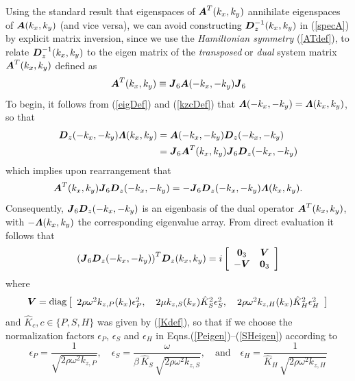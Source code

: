 \documentclass[11pt,a4paper]{article}
\newcommand{\bmi}[1]{\mbox{\boldmath$\mit #1$\unboldmath}}
\begin{document}
Using the standard result that eigenspaces of ${\bmi  A}^{T}({k}_{x},{k}_{y})$ annihilate
eigenspaces of ${\bmi  A}({k}_{x},{k}_{y})$ (and vice versa), we can avoid constructing  ${\bmi  D}_{z}^{-1}({k}_{x},{k}_{y})$ in (\ref{specA}) by explicit
matrix inversion, since we use the {\em Hamiltonian symmetry\/}
(\ref{ATdef}), to relate ${\bmi  D}_{z}^{-1}({k}_{x},{k}_{y})$ to the eigen matrix of the
{\em transposed\/} or {\em
dual\/} system matrix ${\bmi  A}^{T}({k}_{x},{k}_{y})$ defined as
\[
{\bmi  A}^{T}({k}_{x},{k}_{y})\equiv {\bmi  J}_6 {\bmi  A}(-{k}_{x},-{k}_{y}) {\bmi  J}_6
\]
To begin, it follows from (\ref{eigDef}) and (\ref{kzcDef}) that ${\bmi
\Lambda}(-{k}_{x},-{k}_{y})={\bmi \Lambda} ({k}_{x},{k}_{y})$,
so that
\begin{eqnarray*}
{\bmi  D}_{z}(-{k}_{x},-{k}_{y}){\bmi \Lambda} ({k}_{x},{k}_{y})&=
{\bmi  A}(-{k}_{x},-{k}_{y}){\bmi  D}_{z}(-{k}_{x},-{k}_{y})\\
&={\bmi  J}_{6}{\bmi
A}^{T}({k}_{x},{k}_{y}){\bmi  J}_{6}{\bmi  D}_{z}(-{k}_{x},-{k}_{y})
\end{eqnarray*}
which implies upon rearrangement that
\[
{\bmi  A}^{T}({k}_{x},{k}_{y}){\bmi  J}_{6}{\bmi  D}_{z}(-{k}_{x},-{k}_{y})=-{\bmi  J}_{6}
{\bmi  D}_{z}(-{k}_{x},-{k}_{y}){\bmi
\Lambda} ({k}_{x},{k}_{y}).
\]
Consequently, ${\bmi  J}_{6}{\bmi  D}_{z}(-{k}_{x},-{k}_{y})$ is an eigenbasis of the dual
operator ${\bmi
A}^{T}({k}_{x},{k}_{y})$, with $-{\bmi  \Lambda} ({k}_{x},{k}_{y})$ the corresponding eigenvalue array.
From direct evaluation it follows that
\begin{equation} \label{dinv1}
{\left({{\bmi  J}_{6}{\bmi  D}_{z}(-{k}_{x},-{k}_{y})}\right)}^{T}{\bmi
D}_{z}({k}_{x},{k}_{y})= i\left[{\begin{array}{cc}{\bf 0}_{3}&{\bmi V}\\
-{\bmi V}&{\bf 0}_{3}\end{array}}\right]
\end{equation}
where
\[
{\bmi V}=
\mbox{diag}\left[\begin{array}{ccc}
2 \rho {\omega }^{  2}{  k}_{  z, P }({k}_{x}){\epsilon
}_{P}^{  2},\,&
2 \mu {  k}_{  z, S }({k}_{x}) \hat{K}_{S }^{2}{\epsilon }_{S}^{
2},\,&
2 \rho {\omega }^{  2}{  k}_{  z, H }({k}_{x}) \hat{K}_{H }^{2}{\epsilon }_{H}^{  2}
\end{array}\right]
\]
and  $\hat{K}_{c}, c\in\{P,S,H\}$ was given by (\ref{Kdef}),
 so that if we choose the normalization factors ${\epsilon }_{P }$,
${\epsilon }_{S}$ and ${\epsilon }_{H}$ in Eqns.(\ref{Peigen})--(\ref{SHeigen})
according to
 \begin{equation} \label{epsdef}
{\epsilon }_{P }= \frac{1}{\sqrt{2 \rho {\omega }^{  2}{  k}_{
z, P }}}, \quad
{\epsilon }_{S }= \frac{\omega}{\beta\,\hat{K}_{S }\,\sqrt{2 \rho {\omega }^{  2}  {  k}_{
z, S }}}
, \quad \mbox{and} \quad
{\epsilon }_{H }= \frac{1}{\hat{K}_{H }\, \sqrt{2 \rho {\omega }^{  2}  {  k}_{
z, H }}}
\end{equation}
\end{document}
